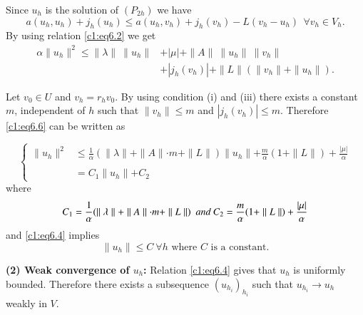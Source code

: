 Since $u_h$ is the solution of $(P_{2h})$ we have 
\begin{equation}
a(u_h, u_h) +j_h(u_h) \leq a(u_h, v_h)+j_h(v_h) - L(v_h - u_h) ~~
\forall v_h \in V_h. \tag{6.5}\label{c1:eq6.5} 
\end{equation}
By using relation \eqref{c1:eq6.2} we get 
\begin{align*}
  \alpha \parallel u_h \parallel^2 \leq \parallel \lambda \parallel
  ~\parallel u_h \parallel & + | \mu | + \parallel A \parallel ~\parallel
  u_h \parallel ~\parallel  v_h \parallel\\ 
  & + | j_h (v_h) | + \parallel L
  \parallel ( \parallel v_h \parallel + \parallel u_h \parallel
  ). \tag{6.6}\label{c1:eq6.6} 
\end{align*}

Let $v_0 \in U$ and $v_h = r_h v_0$. By using condition (i) and
(iii) there exists a constant $m$, independent of $h$ such that
$\parallel v_h \parallel \leq m$ and $|j_h(v_h) | \leq m$. Therefore
\eqref{c1:eq6.6} can be written as  

\begin{equation*}
\begin{cases}
\parallel u_h \parallel^2 & \leq \frac{1}{\alpha} (\parallel \lambda
\parallel + \parallel A \parallel \cdot m + \parallel L \parallel )
\parallel u_h \parallel + \frac{m}{\alpha} (1+ \parallel L \parallel )
+ \frac{| \mu |}{\alpha}\\ 
&\\
& = C_1 \parallel u_h \parallel + C_2
\end{cases}
\end{equation*}
where\pageoriginale 
$$
C_1 = \frac{1}{\alpha}(\parallel \lambda \parallel + \parallel A
\parallel \cdot m + \parallel L \parallel ) ~~\text{\em  and } C_2 =
\frac{m}{\alpha}(1 + \parallel L \parallel ) + \frac{| \mu |}{\alpha} 
$$
and \eqref{c1:eq6.4} implies 
$$
\parallel u_h \parallel \leq C ~\forall h \text{ where } C \text{ is a
  constant}. 
$$

\textbf{(2) Weak convergence of $u_h$:} Relation \eqref{c1:eq6.4} gives that
$u_h$ is uniformly bounded. Therefore there exists a subsequence
$(u_{h_{i}})_{h_{i}}$ such that $u_{h_{i}} \to u_h$ weakly in $V$. 

